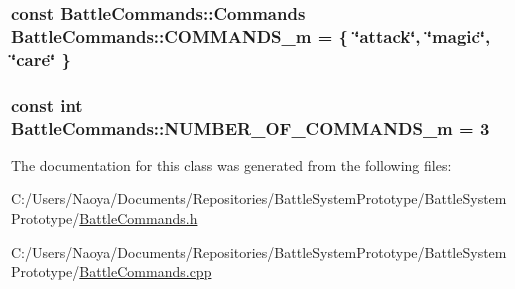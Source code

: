 \subsubsection[{C\+O\+M\+M\+A\+N\+D\+S\+\_\+m}]{\setlength{\rightskip}{0pt plus 5cm}const {\bf Battle\+Commands\+::\+Commands} Battle\+Commands\+::\+C\+O\+M\+M\+A\+N\+D\+S\+\_\+m = \{ \char`\"{}attack\char`\"{}, \char`\"{}magic\char`\"{}, \char`\"{}care\char`\"{} \}\hspace{0.3cm}{\ttfamily [static]}}\label{class_battle_commands_ad187150249ca899f0f6cd16cd8052d0f}
\hypertarget{class_battle_commands_afdec7871d4e52ef80316212c49c80dcd}{}
\subsubsection[{N\+U\+M\+B\+E\+R\+\_\+\+O\+F\+\_\+\+C\+O\+M\+M\+A\+N\+D\+S\+\_\+m}]{\setlength{\rightskip}{0pt plus 5cm}const int Battle\+Commands\+::\+N\+U\+M\+B\+E\+R\+\_\+\+O\+F\+\_\+\+C\+O\+M\+M\+A\+N\+D\+S\+\_\+m = 3\hspace{0.3cm}{\ttfamily [static]}}\label{class_battle_commands_afdec7871d4e52ef80316212c49c80dcd}


The documentation for this class was generated from the following files\+:\begin{DoxyCompactItemize}
\item 
C\+:/\+Users/\+Naoya/\+Documents/\+Repositories/\+Battle\+System\+Prototype/\+Battle\+System\+Prototype/\hyperlink{_battle_commands_8h}{Battle\+Commands.\+h}\item 
C\+:/\+Users/\+Naoya/\+Documents/\+Repositories/\+Battle\+System\+Prototype/\+Battle\+System\+Prototype/\hyperlink{_battle_commands_8cpp}{Battle\+Commands.\+cpp}\end{DoxyCompactItemize}
